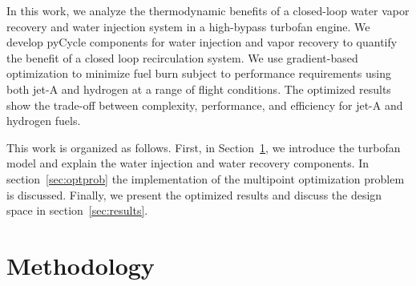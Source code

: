 \documentclass[conf]{new-aiaa}
\begin{document}
In this work, we analyze the thermodynamic benefits of a closed-loop water vapor recovery and water injection system in a high-bypass turbofan engine.
We develop pyCycle components for water injection and vapor recovery to quantify the benefit of a closed loop recirculation system.
We use gradient-based optimization to minimize fuel burn subject to performance requirements using both jet-A and hydrogen at a range of flight conditions.
The optimized results show the trade-off between complexity, performance, and efficiency for jet-A and hydrogen fuels.

This work is organized as follows. First, in Section~\ref{sec:method}, we introduce the turbofan model and explain the water injection and water recovery components.
In section~\ref{sec:optprob} the implementation of the multipoint optimization problem is discussed.
Finally, we present the optimized results and discuss the design space in section~\ref{sec:results}.

\section{Methodology}
\label{sec:method}
\end{document}
